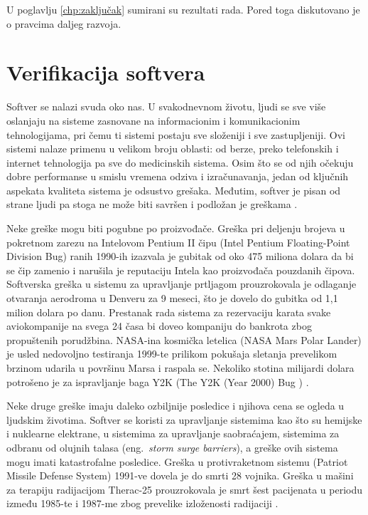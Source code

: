 \documentclass[12pt,oneside]{memoir}
\begin{document}
U poglavlju \ref{chp:zaključak} sumirani su rezultati rada. Pored toga diskutovano je o pravcima daljeg razvoja. 





\chapter{Verifikacija softvera}
\label{chp:verifikacija softvera}

Softver se nalazi svuda oko nas. U svakodnevnom životu, ljudi se sve više oslanjaju na sisteme zasnovane na informacionim i komunikacionim tehnologijama, pri čemu ti sistemi postaju sve složeniji i sve zastupljeniji. Ovi sistemi nalaze primenu u velikom broju oblasti: od berze, preko telefonskih i internet tehnologija pa sve do medicinskih sistema. Osim što se od njih očekuju dobre performanse u smislu vremena odziva i izračunavanja, jedan od ključnih aspekata kvaliteta sistema je odsustvo grešaka. Međutim, softver je pisan od strane ljudi pa stoga ne može biti savršen i podložan je greškama \cite{PoMC, SoftTest}.

Neke greške mogu biti pogubne po proizvođače. Greška pri deljenju brojeva u pokretnom zarezu na Intelovom Pentium II čipu (Intel Pentium Floating-Point Division Bug) ranih 1990-ih izazvala je gubitak od oko 475 miliona dolara da bi se čip zamenio i narušila je reputaciju Intela kao proizvođača pouzdanih čipova. Softverska greška u sistemu za upravljanje prtljagom prouzrokovala je odlaganje otvaranja aerodroma u Denveru za 9 meseci, što je dovelo do gubitka od 1,1 milion dolara po danu. Prestanak rada sistema za rezervaciju karata svake aviokompanije na svega 24 časa bi doveo kompaniju do bankrota zbog propuštenih porudžbina. NASA-ina kosmička letelica (NASA Mars Polar Lander) je usled nedovoljno testiranja 1999-te prilikom pokušaja sletanja prevelikom brzinom udarila u površinu Marsa i raspala se. Nekoliko stotina milijardi dolara potrošeno je za ispravljanje baga Y2K (The Y2K (Year 2000) Bug \cite{y2k}) \cite{PoMC, SoftTest}. 

Neke druge greške imaju daleko ozbiljnije posledice i njihova cena se ogleda u ljudskim životima. Softver se koristi za upravljanje sistemima kao što su hemijske i nuklearne elektrane, u sistemima za upravljanje saobraćajem, sistemima za odbranu od olujnih talasa (eng.~\textit{storm surge barriers}), a greške ovih sistema mogu imati katastrofalne posledice. Greška u protivraketnom sistemu (Patriot Missile Defense System) 1991-ve dovela je do smrti 28 vojnika. Greška u mašini za terapiju radijacijom Therac-25 prouzrokovala je smrt šest pacijenata u periodu između 1985-te i 1987-me zbog prevelike izloženosti radijaciji  \cite{PoMC, SoftTest}.
\end{document}
